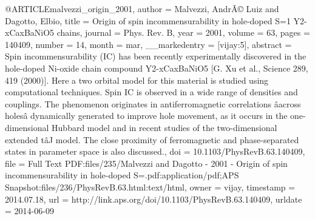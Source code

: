 @ARTICLE{malvezzi_origin_2001,
  author = {Malvezzi, AndrÃ© Luiz and Dagotto, Elbio},
  title = {Origin of spin incommensurability in hole-doped S=1 Y2-{xCaxBaNiO}5
	chains},
  journal = {Phys. Rev. B},
  year = {2001},
  volume = {63},
  pages = {140409},
  number = {14},
  month = mar,
  __markedentry = {[vijay:5]},
  abstract = {Spin incommensurability ({IC}) has been recently experimentally discovered
	in the hole-doped Ni-oxide chain compound Y2-{xCaxBaNiO}5 [G. Xu
	et al., Science 289, 419 (2000)]. Here a two orbital model for this
	material is studied using computational techniques. Spin {IC} is
	observed in a wide range of densities and couplings. The phenomenon
	originates in antiferromagnetic correlations âacross holesâ dynamically
	generated to improve hole movement, as it occurs in the one-dimensional
	Hubbard model and in recent studies of the two-dimensional extended
	tâJ model. The close proximity of ferromagnetic and phase-separated
	states in parameter space is also discussed.},
  doi = {10.1103/PhysRevB.63.140409},
  file = {Full Text PDF:files/235/Malvezzi and Dagotto - 2001 - Origin of spin incommensurability in hole-doped S=.pdf:application/pdf;APS Snapshot:files/236/PhysRevB.63.html:text/html},
  owner = {vijay},
  timestamp = {2014.07.18},
  url = {http://link.aps.org/doi/10.1103/PhysRevB.63.140409},
  urldate = {2014-06-09}
}

